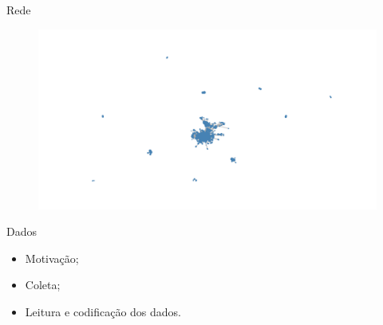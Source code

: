 \documentclass{beamer}
\begin{document}
\begin{frame}{Rede}
\begin{figure}
    \centering
    \includegraphics[scale = 0.4]{img/graph.png}
\end{figure}
\end{frame}

\begin{frame}{Dados}
\begin{itemize}
    \item Motivação;
    \vspace{24pt}
        
    \item Coleta;
    \vspace{24pt}
        
    \item Leitura e codificação dos dados.
\end{itemize}
\end{frame}
\end{document}
